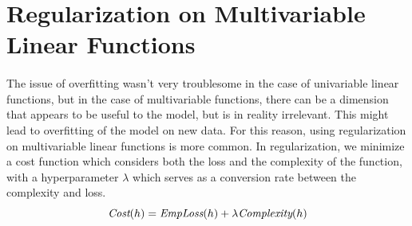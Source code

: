 \documentclass{article}
\begin{document}
















\section*{Regularization on Multivariable Linear Functions}
  \paragraph{}
    The issue of overfitting wasn’t very troublesome in the case of univariable linear functions, but in the case of multivariable functions, there can be a dimension that appears to be useful to the model, but is in reality irrelevant. This might lead to overfitting of the model on new data. For this reason, using regularization on multivariable linear functions is more common. In regularization, we minimize a cost function which considers both the loss and the complexity of the function, with a hyperparameter $\lambda$ which serves as a conversion rate between the complexity and loss.    
    \begin{equation*}
      \emph{Cost}(h) = \emph{EmpLoss}(h) + \lambda \emph{Complexity}(h)
    \end{equation*}
\end{document}
